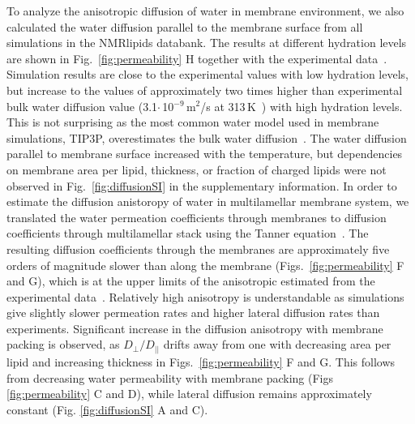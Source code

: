 \documentclass[fleqn,10pt]{wlscirep}
\begin{document}
To analyze the anisotropic diffusion of water in membrane environment, we also calculated the water diffusion parallel to the membrane surface from all simulations in the NMRlipids databank. The results at different hydration levels are shown in Fig.~\ref{fig:permeability} H together with the experimental data~\cite{rudakova04}. 
Simulation results are close to the experimental values with low hydration levels, but increase to the values of approximately two times higher than experimental bulk water diffusion value (3.1$\cdot$\,10$^{-9}$\,m$^2$/s at 313\,K~\cite{khakimov08}) with high hydration levels. This is not surprising as the most common water model used in membrane simulations, TIP3P, overestimates the bulk water diffusion~\cite{pathirannahalage21}. The water diffusion parallel to membrane surface increased with the temperature, but dependencies on membrane area per lipid, thickness, or fraction of charged lipids were not observed in Fig.~\ref{fig:diffusionSI} in the supplementary information. In order to estimate the diffusion anistoropy of water in multilamellar membrane system, we translated the water permeation coefficients through membranes to diffusion coefficients through multilamellar stack using the Tanner equation~\cite{tanner78,wasterby02}. The resulting diffusion coefficients through the membranes are approximately five orders of magnitude slower than along the membrane (Figs.~\ref{fig:permeability} F and G), which is at the upper limits of the anisotropic estimated from the experimental data~\cite{nitsche19}. Relatively high anisotropy is understandable as simulations give slightly slower permeation rates and higher lateral diffusion rates than experiments. Significant increase in the diffusion anisotropy with membrane packing is observed, as $D_{\perp}/D_{||}$ drifts away from one with decreasing area per lipid and increasing thickness in Figs.~\ref{fig:permeability} F and G.
This follows from decreasing water permeability with membrane packing (Figs \ref{fig:permeability} C and D), while lateral diffusion remains approximately constant (Fig. \ref{fig:diffusionSI} A and C). 
\end{document}
